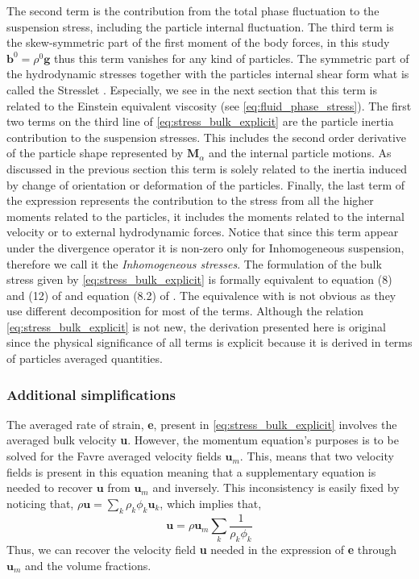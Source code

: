 The second term is the  contribution from the total phase fluctuation to the suspension stress, including the particle internal fluctuation. 
The third term is the skew-symmetric part of the first moment of the body forces, in this study $\textbf{b}^0 = \rho^0 \textbf{g}$ thus this term vanishes for any kind of particles. 
The symmetric part of the hydrodynamic stresses together with the particles internal shear form what is called the Stresslet \citep{pozrikidis1992boundary}. 
Especially, we see in the next section that this term is related to the Einstein equivalent viscosity (see \ref{eq:fluid_phase_stress}). 
The first two terms on the third line of \ref{eq:stress_bulk_explicit} are the particle inertia contribution to the suspension stresses. 
This includes the second order derivative of the particle shape represented by $\textbf{M}_\alpha$ and the internal particle motions. 
As discussed in the previous section this term is solely related to the inertia induced by change of orientation or deformation of the particles. 
Finally, the last term of the expression represents the contribution to the stress from all the higher moments related to the particles, it includes the moments related to the internal velocity or to external hydrodynamic forces.  
Notice that since this term appear under the divergence operator it is non-zero only for Inhomogeneous suspension, therefore we call it the \textit{Inhomogeneous stresses}. 
The formulation of the bulk stress given by \ref{eq:stress_bulk_explicit} is formally equivalent to equation (8) and (12) of \citet{lhuillier1996contribution} and equation (8.2) of \citet{zhang1997momentum}.
The equivalence with \citet{zhang1997momentum} is not obvious as they use different decomposition for most of the terms. 
Although the relation \ref{eq:stress_bulk_explicit} is not new, the derivation presented here is original since the physical significance of all terms is explicit because it is derived in terms of particles averaged quantities.

    
\subsubsection{Additional simplifications}

The averaged rate of strain, \textbf{e}, present in \ref{eq:stress_bulk_explicit} involves the averaged bulk velocity \textbf{u}. 
However, the momentum equation's purposes is to be solved for the Favre averaged velocity fields $\textbf{u}_m$. 
This, means that two velocity fields is present in this equation meaning that a supplementary equation is needed to recover $\textbf{u}$ from $\textbf{u}_m$ and inversely. 
This inconsistency is easily fixed by noticing that, $\rho \textbf{u} = \sum_k \rho_k \phi_k \textbf{u}_k$, which implies that, 
\begin{equation}
    \textbf{u}=\rho \textbf{u}_m\sum_k \frac{1}{\rho_k \phi_k}
\end{equation}
Thus, we can recover the velocity field \textbf{u} needed in the expression of \textbf{e} through $\textbf{u}_m$ and the volume fractions. 

